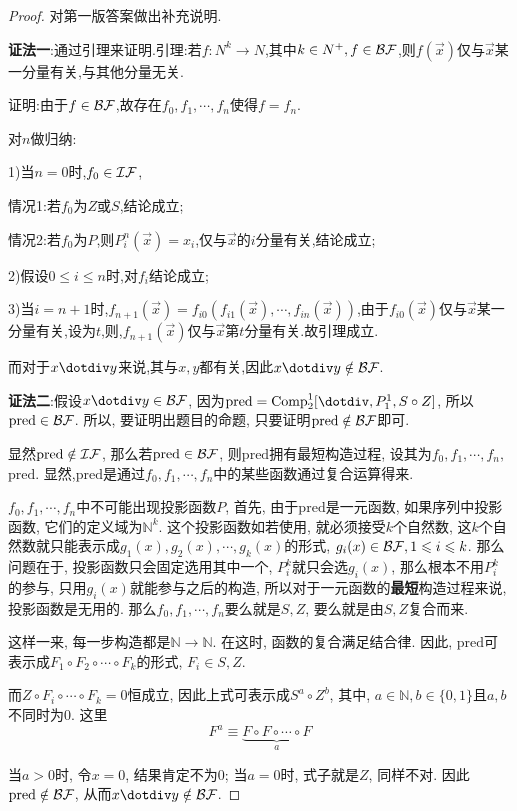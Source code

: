 \begin{proof}{\color {red} {对第一版答案做出补充说明.}}

\textbf{证法一}:通过引理来证明.引理:若$f:N^k \rightarrow N$,其中$k \in N^+, f \in \mathcal{BF}$,则$f(\Vec{x})$仅与$\Vec{x}$某一分量有关,与其他分量无关.

证明:由于$f \in \mathcal{BF}$,故存在$f_0,f_1,\cdots,f_n$使得$f=f_n$.

对$n$做归纳:

1)当$n=0$时,$f_0 \in \mathcal{IF}$,

情况1:若$f_0$为$Z$或$S$,结论成立;

情况2:若$f_0$为$P$,则$P_i^n(\Vec{x})=x_i$,仅与$\Vec{x}$的$i$分量有关,结论成立;

2)假设$0 \le i \le n$时,对$f_i$结论成立;

3)当$i=n+1$时,$f_{n+1}(\Vec{x})= f_{i0}(f_{i1}(\Vec{x}),\cdots,f_{in}(\Vec{x}))$,由于$f_{i0}(\Vec{x})$仅与$\Vec{x}$某一分量有关,设为$t$,则,$f_{n+1}(\Vec{x})$仅与$\Vec{x}$第$t$分量有关.故引理成立.

而对于$x \dotdiv y$来说,其与$x,y$都有关,因此$x\dotdiv y \notin \BF$.

\hspace*{\fill}

\textbf{证法二}:假设$x\dotdiv y\in\BF$, 因为$\mathrm{pred}=\mathrm{Comp}_2^1[\dotdiv,P_1^1,S\circ Z]$, 所以$\mathrm{pred}\in\mathcal{BF}$. 所以, 要证明出题目的命题, 只要证明$\mathrm{pred}\notin\mathcal{BF}$即可.

显然$\mathrm{pred}\notin\mathcal{IF}$, 那么若$\mathrm{pred}\in\mathcal{BF}$, 则$\mathrm{pred}$拥有最短构造过程, 设其为$f_0,f_1,\cdots,f_n,$ $\mathrm{pred}$. 显然,$\mathrm{pred}$是通过$f_0,f_1,\cdots,f_n$中的某些函数通过复合运算得来.

$f_0,f_1,\cdots,f_n$中不可能出现投影函数$P$, 首先, 由于$\mathrm{pred}$是一元函数, 如果序列中投影函数, 它们的定义域为$\mathbb{N}^k$. 这个投影函数如若使用, 就必须接受$k$个自然数, 这$k$个自然数就只能表示成$g_1(x),g_2(x),\cdots,g_k(x)$的形式, $g_i(x)\in\mathcal{BF},1\leqslant i\leqslant k$. 那么问题在于, 投影函数只会固定选用其中一个, $P_i^k$就只会选$g_i(x)$, 那么根本不用$P_i^k$的参与, 只用$g_i(x)$就能参与之后的构造, 所以对于一元函数的\textbf{最短}构造过程来说, 投影函数是无用的. 那么$f_0,f_1,\cdots,f_n$要么就是$S, Z$, 要么就是由$S, Z$复合而来.

这样一来, 每一步构造都是$\mathbb{N}\to\mathbb{N}$. 在这时, 函数的复合满足结合律. 因此, $\mathrm{pred}$可表示成$F_1\circ F_2\circ \cdots \circ F_k$的形式, $F_i\in{S,Z}$.

而$Z\circ F_i\circ \cdots \circ F_k=0$恒成立, 因此上式可表示成$S^a\circ Z^b$, 其中, $a\in\mathbb{N},b\in\{0,1\}$且$a,b$不同时为0. 这里$$F^a\equiv \underbrace{F\circ F\circ \cdots \circ F}_{a}$$

当$a>0$时, 令$x=0$, 结果肯定不为0; 当$a=0$时, 式子就是$Z$, 同样不对. 因此$\mathrm{pred}\notin\mathcal{BF}$, 从而$x\dotdiv y\notin\BF$.
\end{proof}